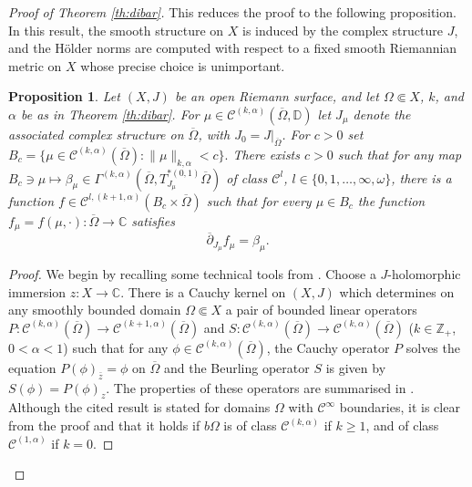 \documentclass[11pt]{amsart}
\numberwithin{equation}{section}
\newtheorem{proposition}[theorem]{Proposition}
\theoremstyle{definition}
\newcommand\Cscr{\mathscr{C}}
\newcommand\C{\mathbb{C}}
\newcommand\D{\overline{\mathbb D}}
\renewcommand\D{\mathbb D}
\newcommand\Z{\mathbb{Z}}
\newcommand\dibar{\overline\partial}
\begin{document}
\begin{proof}[Proof of Theorem \ref{th:dibar}]
This reduces the proof to the following proposition.
In this result, the smooth structure on $X$ is induced  
by the complex structure $J$, and the H\"older norms are 
computed with respect to a fixed smooth Riemannian metric on $X$
whose precise choice is unimportant. 

%
%
\begin{proposition}\label{prop:dibar}
Let $(X,J)$ be an open Riemann surface, 
and let $\Omega\Subset X$, $k$, and $\alpha$ be as in Theorem \ref{th:dibar}.  
For $\mu\in \Cscr^{(k,\alpha)}(\overline \Omega,\D)$ let $J_\mu$ 
denote the associated complex structure on $\overline\Omega$, 
with $J_0=J|_{\overline \Omega}$. For $c>0$ set 
$
	B_c=\{\mu \in \Cscr^{(k,\alpha)}(\overline\Omega) : 
	\|\mu\|_{k,\alpha} <c\}.
$
There exists $c>0$ such that for any map 
$B_c\ni \mu \mapsto \beta_\mu \in  
\Gamma^{(k,\alpha)}(\overline\Omega,T^{*(0,1)}_{J_\mu}\overline\Omega)$
of class $\Cscr^l$, $l\in \{0,1,\ldots,\infty,\omega\}$, 
there is a function 
$f\in \Cscr^{l,(k+1,\alpha)}(B_c\times \overline\Omega)$ 
such that for every $\mu \in B_c$
the function $f_\mu=f(\mu,\cdotp):\overline\Omega\to\C$ satisfies 
\begin{equation}\label{eq:dibar2}
	\dibar_{J_\mu} f_\mu = \beta_\mu. 
\end{equation}
\end{proposition}

\begin{proof}
We begin by recalling some
technical tools from \cite[Secs.\ 3-4]{Forstneric2024Runge}.
Choose a $J$-holomorphic immersion $z:X\to\C$.  
There is a Cauchy kernel on $(X,J)$ which determines on any 
smoothly bounded domain $\Omega\Subset X$ a pair 
of bounded linear operators 
$P:\Cscr^{(k,\alpha)}(\overline \Omega) \to \Cscr^{(k+1,\alpha)}(\overline \Omega)$ and 
$S:\Cscr^{(k,\alpha)}(\overline \Omega) \to \Cscr^{(k,\alpha)}(\overline \Omega)$
($k\in\Z_+$, $0<\alpha<1$) such that 
for any $\phi\in \Cscr^{(k,\alpha)}(\overline \Omega)$, the 
Cauchy operator $P$ solves the equation
$P(\phi)_{\bar z}=\phi$ on $\overline \Omega$ and 
the Beurling operator $S$ is given by $S(\phi)=P(\phi)_z$. 
The properties of these operators are summarised in 
\cite[Theorem 3.2]{Forstneric2024Runge}. 
Although the cited result is stated for domains $\Omega$
with $\Cscr^\infty$ boundaries, it is clear from the proof and 
\cite[Lemma 6.37]{GilbargTrudinger1983} that it holds 
if $b\Omega$ is of class $\Cscr^{(k,\alpha)}$ if $k\ge 1$, 
and of class $\Cscr^{(1,\alpha)}$ if $k=0$.


\end{proof}
\end{proof}
\end{document}
